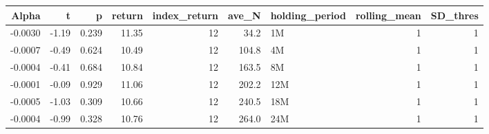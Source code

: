 \begin{table}[ht]
\centering
\begin{tabular}{rrrrrrlrr}
  \hline
Alpha & t & p & return & index\_return & ave\_N & holding\_period & rolling\_mean & SD\_thres \\ 
  \hline
-0.0030 & -1.19 & 0.239 & 11.35 & 12 & 34.2 & 1M &  1 &  1 \\ 
  -0.0007 & -0.49 & 0.624 & 10.49 & 12 & 104.8 & 4M &  1 &  1 \\ 
  -0.0004 & -0.41 & 0.684 & 10.84 & 12 & 163.5 & 8M &  1 &  1 \\ 
  -0.0001 & -0.09 & 0.929 & 11.06 & 12 & 202.2 & 12M &  1 &  1 \\ 
  -0.0005 & -1.03 & 0.309 & 10.66 & 12 & 240.5 & 18M &  1 &  1 \\ 
  -0.0004 & -0.99 & 0.328 & 10.76 & 12 & 264.0 & 24M &  1 &  1 \\ 
   \hline
\end{tabular}
\end{table}

